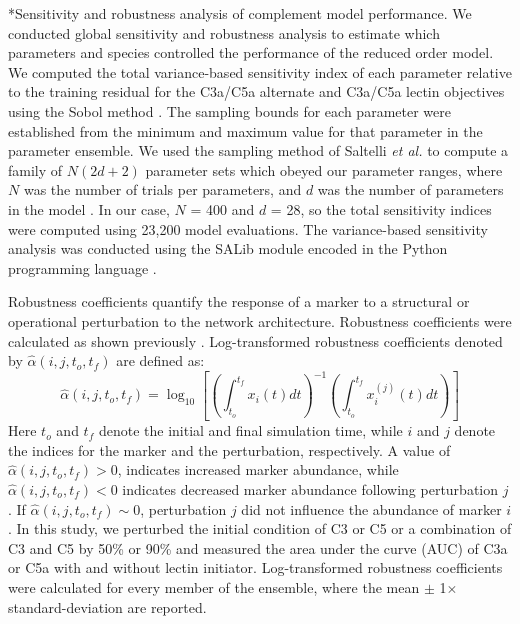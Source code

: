 \documentclass[12pt]{article}
\makeatletter
\renewcommand\subsection{\@startsection
	{subsection}{2}{0mm}
	{-0.05in}
	{-0.5\baselineskip}
	{\normalfont\normalsize\bfseries}}
\makeatother
\begin{document}
\subsection*{Sensitivity and robustness analysis of complement model performance.}
We conducted global sensitivity and robustness analysis to estimate which parameters and species controlled the performance of the reduced order model.
We computed the total variance-based sensitivity index of each parameter relative to the training residual for the C3a/C5a alternate and C3a/C5a lectin objectives
using the Sobol method \cite{SOBOL_METHOD}. The sampling bounds for each parameter were established from the minimum and maximum value for that parameter in the parameter ensemble.
We used the sampling method of Saltelli \textit{et al.} to compute a family of $N\left(2d+2\right)$ parameter sets which obeyed our parameter ranges,
where $N$ was the number of trials per parameters, and $d$ was the number of parameters in the model \cite{saltelli2010variance}.
In our case, $N$ = 400 and $d$ = 28, so the total sensitivity indices were computed using 23,200 model evaluations.
The variance-based sensitivity analysis was conducted using the SALib module encoded in the Python programming language \cite{SALIB}.

Robustness coefficients quantify the response of a marker to a structural or operational perturbation to the network architecture.
Robustness coefficients were calculated as shown previously \cite{Tasseff:2011aa}.
Log-transformed robustness coefficients denoted by $\hat{\alpha}\left(i,j,t_{o},t_{f}\right)$ are defined as:
\begin{equation}
\hat{\alpha}\left(i,j,t_{o},t_{f}\right)=\log_{10}\left[\left(\displaystyle\int_{t_{o}}^{t_{f}}x_{i}\left(t\right)dt\right)^{-1}\left(\displaystyle\int_{t_{o}}^{t_{f}}x^{(j)}_{i}\left(t\right)dt\right)\right]
\end{equation}
Here $t_o$ and $t_f$ denote the initial and final simulation time, while $i$ and $j$ denote the indices for the marker and the perturbation, respectively.
A value of $\hat{\alpha}\left(i,j,t_{o},t_{f}\right)>0$, indicates increased marker abundance, while $\hat{\alpha}\left(i,j,t_{o},t_{f}\right)<0$ indicates decreased marker abundance following perturbation $j$. If $\hat{\alpha}\left(i,j,t_{o},t_{f}\right)\sim{0}$, perturbation $j$ did not influence the abundance of marker $i$.
In this study, we perturbed the initial condition of C3 or C5 or a combination of C3 and C5 by 50\% or 90\% and measured the area under the curve (AUC)
of C3a or C5a with and without lectin initiator.
Log-transformed robustness coefficients were calculated for every member of the ensemble, where the mean $\pm$ 1$\times$standard-deviation are reported.
\end{document}
